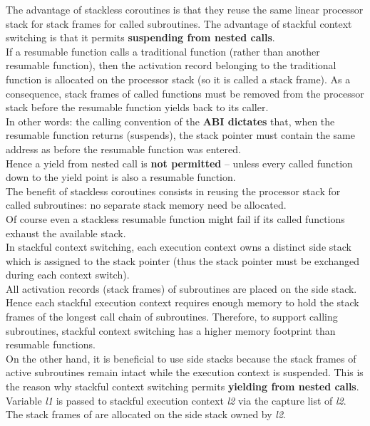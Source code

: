 The advantage of stackless coroutines is that they reuse the same linear
processor stack for stack frames for called subroutines. The advantage of
stackful context switching is that it permits {\bfseries suspending from
nested calls}.\\
\newline
If a resumable function calls a traditional function (rather than another
resumable function), then the activation record belonging to the traditional
function is allocated on the processor stack (so it is called a stack frame).
As a consequence, stack frames of called functions must be removed from the
processor stack before the resumable function yields back to its caller.\\
In other words: the calling convention of the {\bfseries ABI dictates} that,
when the resumable function returns (suspends), the stack pointer must contain
the same address as before the resumable function was entered.\\
Hence a yield from nested call is {\bfseries not permitted} -- unless every
called function down to the yield point is also a resumable function.\\
The benefit of stackless coroutines consists in reusing the processor stack
for called subroutines: no separate stack memory need be allocated.\\
\newline
Of course even a stackless resumable function might fail if its called
functions exhaust the available stack.\\
\newline
In stackful context switching, each execution context owns a
distinct side stack which is assigned to the stack pointer (thus the stack
pointer must be exchanged during each context switch).\\
All activation records (stack frames) of subroutines are placed on the side
stack. Hence each stackful execution context requires enough memory to hold
the stack frames of the longest call chain of subroutines. Therefore, to
support calling subroutines, stackful context switching has a higher memory
footprint than resumable functions.\\
On the other hand, it is beneficial to use side stacks because the stack
frames of active subroutines remain intact while the execution context is
suspended. This is the reason why stackful context switching permits
{\bfseries yielding from nested calls}.
Variable \emph{l1} is passed to stackful execution context \emph{l2} via
the capture list of \emph{l2}. The stack frames of  are
allocated on the side stack owned by \emph{l2}.

